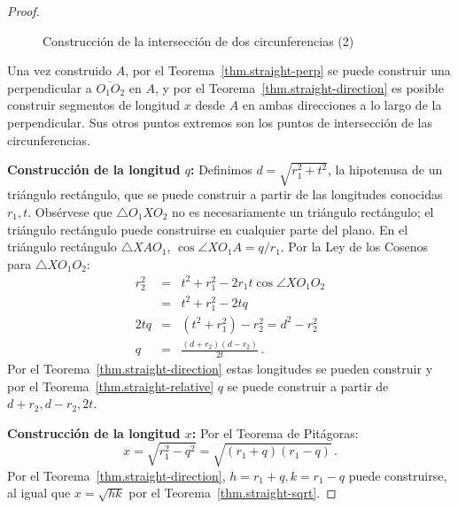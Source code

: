 \begin{proof}
\begin{figure}%
\begin{center}
\end{center}
\caption{Construcción de la intersección de dos circunferencias (2)}\label{f.se-circle-circle2}
\end{figure}

Una vez construido $A$, por el Teorema~\ref{thm.straight-perp} se puede construir una perpendicular a $\overline{O_1O_2}$ en $A$, y por el Teorema~\ref{thm.straight-direction} es posible construir segmentos de longitud $x$ desde $A$ en ambas direcciones a lo largo de la perpendicular. Sus otros puntos extremos son los puntos de intersección de las circunferencias.

\noindent\textbf{Construcción de la longitud $q$:} Definimos $d=\sqrt{r_1^2+t^2}$, la hipotenusa de un triángulo rectángulo, que se puede construir a partir de las longitudes conocidas $r_1,t$. Obsérvese que $\triangle O_1XO_2$ no es necesariamente un triángulo rectángulo; el triángulo rectángulo puede construirse en cualquier parte del plano. En el triángulo rectángulo $\triangle XAO_1$, $\cos\angle XO_1A=q/r_1$. Por la Ley de los Cosenos para $\triangle XO_1O_2$:
\begin{eqnarray*}
r_2^2 &=& t^2 + r_1^2 - 2r_1t\cos\angle XO_1O_2\\
&=& t^2 + r_1^2 - 2tq\\
2tq &=& (t^2+r_1^2) - r_2^2=d^2-r_2^2\\
q&=&\frac{(d+r_2)(d-r_2)}{2t}\,.
\end{eqnarray*}
Por el Teorema~\ref{thm.straight-direction} estas longitudes se pueden construir y por el Teorema~\ref{thm.straight-relative} $q$ se puede construir a partir de $d+r_2,d-r_2,2t$.

\noindent\textbf{Construcción de la longitud $x$:} Por el Teorema de Pitágoras:
\[
x=\sqrt{r_1^2-q^2}=\sqrt{(r_1+q)(r_1-q)}\,.
\]
Por el Teorema~\ref{thm.straight-direction}, $h =r_1+ q,k= r_1 - q$ puede construirse, al igual que $x=\sqrt{hk}$ por el Teorema~\ref{thm.straight-sqrt}.
\end{proof}

